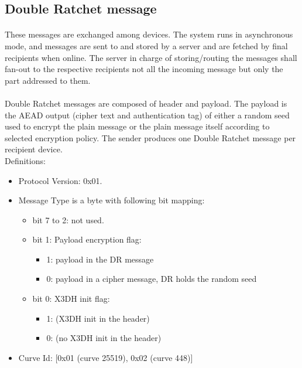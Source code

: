 \documentclass[a4paper,11pt]{article}
\begin{document}
  \subsection{Double Ratchet message}
    \paragraph*{}These messages are exchanged among devices. The system runs in asynchronous mode, and messages are sent to and stored by a server and are fetched by final recipients when online. The server in charge of storing/routing the messages shall fan-out to the respective recipients not all the incoming message but only the part addressed to them.

    \paragraph*{}Double Ratchet messages are composed of header and payload. The payload is the AEAD output (cipher text and authentication tag) of either a random seed used to encrypt the plain message or the plain message itself according to selected encryption policy. The sender produces one Double Ratchet message per recipient device.\\
      Definitions:
      \begin{itemize}
      \item Protocol Version: 0x01.
      \item Message Type is a byte with following bit mapping:
        \begin{itemize}
          \item bit 7 to 2: not used.
          \item bit 1: Payload encryption flag:
            \begin{itemize}
              \item 1: payload in the DR message
              \item 0: payload in a cipher message, DR holds the random seed
            \end{itemize}
          \item bit 0: X3DH init flag:
            \begin{itemize}
              \item 1: (X3DH init in the header)
              \item 0: (no X3DH init in the header)
            \end{itemize}
        \end{itemize}
      \item Curve Id: [0x01 (curve 25519), 0x02 (curve 448)]
      \end{itemize}
\end{document}
